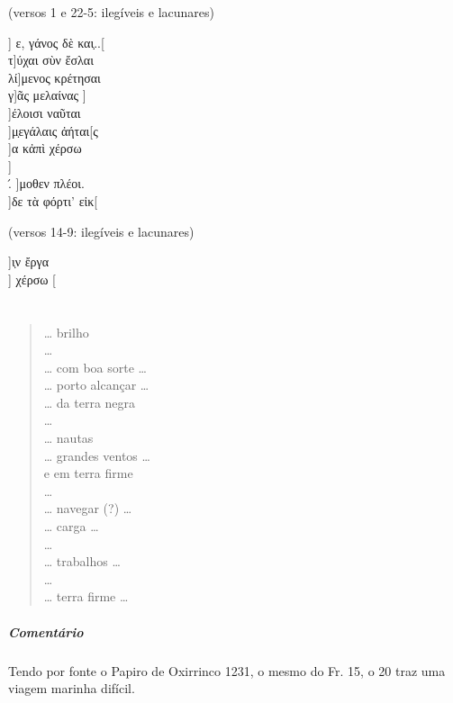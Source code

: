 {\begin{gkverse}
\textnormal{(versos 1 e 22-5: ilegíveis e lacunares)}

] ε, γάνος δὲ και̣..[\\
τ]ύχαι σὺν ἔσλαι\\
         λί]μενος κρέτησαι\\
  γ]ᾶς μελαίνας
    ]\\
    ]έλοισι ναῦται\\
  ]μ̣εγάλαις ἀήται[ς\\
  ]α κἀπὶ χέρσω\\
    ]\\
  .́ ]μοθεν πλέοι.\\
  ]δε τὰ φόρτι’ εἰκ[

\textnormal{(versos 14-9: ilegíveis e lacunares)}

]ι̣ν ἔργα\\
] χέρσω [
\end{gkverse}

\chapter*{}
\section*{}


\begin{verse}
\ldots{} brilho\\
\ldots{}\\
\ldots{} com boa sorte \ldots{}\\
\ldots{} porto alcançar \ldots{} \\
\ldots{} da terra negra\\
\ldots{} \\
\ldots{} nautas\\
\ldots{} grandes ventos \ldots{}\\
e em terra firme\\
\ldots{}\\
\ldots{} navegar (?) \ldots{}\\
\ldots{} carga \ldots{}\\
\ldots{}\\
\ldots{} trabalhos \ldots{}\\
\ldots{}\\
\ldots{} terra firme \ldots{}
\end{verse}

{\paragraph{Comentário} Tendo por fonte o Papiro de Oxirrinco 1231, o mesmo do Fr. 15, o 20 traz uma viagem marinha difícil.}

}
